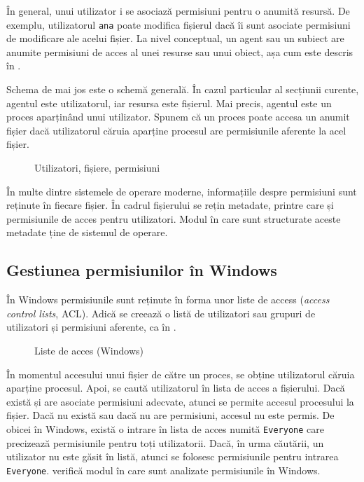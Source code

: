 În general, unui utilizator i se asociază permisiuni pentru o anumită resursă.
De exemplu, utilizatorul \texttt{ana} poate modifica fișierul  dacă îi sunt asociate permisiuni de modificare ale acelui fișier.
La nivel conceptual, un agent sau un subiect are anumite permisiuni de acces al unei resurse sau unui obiect, așa cum este descris în .

Schema de mai jos este o schemă generală.
În cazul particular al secțiunii curente, agentul este utilizatorul, iar resursa este fișierul.
Mai precis, agentul este un proces aparținând unui utilizator.
Spunem că un proces poate accesa un anumit fișier dacă utilizatorul căruia aparține procesul are permisiunile aferente la acel fișier.

\begin{figure}[htbp]
  \centering
  \def\svgwidth{0.7\columnwidth}
  
  \caption{Utilizatori, fișiere, permisiuni}
  \label{fig:user:user-file-perm}
\end{figure}

În multe dintre sistemele de operare moderne, informațiile despre permisiuni sunt reținute în fiecare fișier.
În cadrul fișierului se rețin metadate, printre care și permisiunile de acces pentru utilizatori.
Modul în care sunt structurate aceste metadate ține de sistemul de operare.

\subsection{Gestiunea permisiunilor în Windows}
\label{sec:user:windows-perm}

În Windows permisiunile sunt reținute în forma unor liste de access (\textit{access control lists}, ACL).
Adică se creează o listă de utilizatori sau grupuri de utilizatori și permisiuni aferente, ca în .

\begin{figure}[htbp]
  \centering
  \def\svgwidth{0.7\columnwidth}
  
  \caption{Liste de acces (Windows)}
  \label{fig:user:acl}
\end{figure}

În momentul accesului unui fișier de către un proces, se obține utilizatorul căruia aparține procesul.
Apoi, se caută utilizatorul în lista de acces a fișierului.
Dacă există și are asociate permisiuni adecvate, atunci se permite accesul procesului la fișier.
Dacă nu există sau dacă nu are permisiuni, accesul nu este permis.
De obicei în Windows, există o intrare în lista de acces numită \texttt{Everyone} care precizează permisiunile pentru toți utilizatorii.
Dacă, în urma căutării, un utilizator nu este găsit în listă, atunci se folosesc permisiunile pentru intrarea \texttt{Everyone}.
 verifică modul în care sunt analizate permisiunile în Windows.

